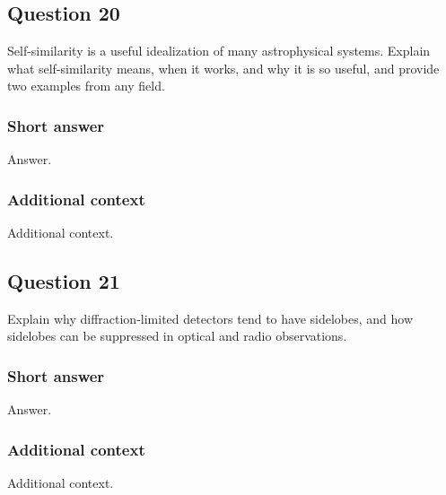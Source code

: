 \documentclass[a4paper,10pt]{article}
\begin{document}

\newpage
\subsection{Question 20}

Self-similarity is a useful idealization of many astrophysical systems. Explain what self-similarity means, when it works, and why it is so useful, and provide two examples from any field.

\subsubsection{Short answer}

Answer.

\subsubsection{Additional context}

Additional context.


\newpage
\subsection{Question 21}

Explain why diffraction-limited detectors tend to have sidelobes, and how sidelobes can be suppressed in optical and radio observations.

\subsubsection{Short answer}

Answer.

\subsubsection{Additional context}

Additional context.

\end{document}
